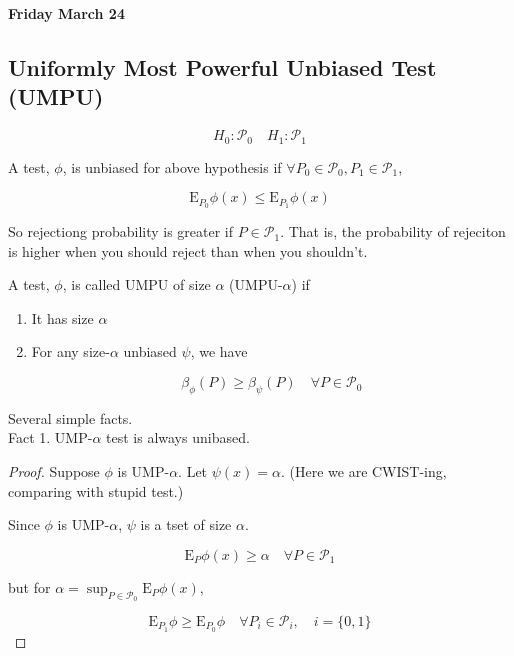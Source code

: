\documentclass[11pt,fleqn]{book} %
\newcommand{\E}{\mathrm{E}}
\begin{document}
\textbf{Friday March 24}\\

\subsection{Uniformly Most Powerful Unbiased Test (UMPU)}

		$$H_0: \mathcal{P}_0 \quad H_1: \mathcal{P}_1 $$


\begin{definition}
	A test, $\phi$, is unbiased for above hypothesis if $\forall P_0 \in \mathcal{P}_0, P_1 \in \mathcal{P}_1$, 

			$$\E_{P_0} \phi(x) \leq \E_{P_1} \phi(x) $$

	So rejectiong probability is greater if $P \in \mathcal{P}_1$.  That is, the probability of rejeciton is higher when you should reject than when you shouldn't. 


\end{definition}

\begin{definition}
	A test, $\phi$, is called UMPU of size $\alpha$ (UMPU-$\alpha$) if 

			\begin{enumerate}
				\item It has size $\alpha$
				\item For any size-$\alpha$ unbiased $\psi$, we have

						$$\beta_\phi (P) \geq \beta_\psi (P) \quad \forall P \in \mathcal{P}_0$$ 
			\end{enumerate}
\end{definition}


Several simple facts. \\


Fact 1.  UMP-$\alpha$ test is always unibased. 

	\begin{proof}
		Suppose $\phi$ is UMP-$\alpha$. Let $\psi(x) = \alpha$. (Here we are CWIST-ing, comparing with stupid test.)

		Since $\phi$ is UMP-$\alpha$, $\psi$ is a tset of size $\alpha. $

				$$\E_P  \phi(x) \geq \alpha \quad \forall P \in \mathcal{P}_1 $$

		but for $\alpha = \sup_{P \in \mathcal{P}_0} \E_P \phi(x)$, 

				$$\E_{P_1} \phi \geq \E_{P_0} \phi \quad \forall P_i \in \mathcal{P}_i, \quad i = \{0, 1\} $$

	\end{proof}
\end{document}
